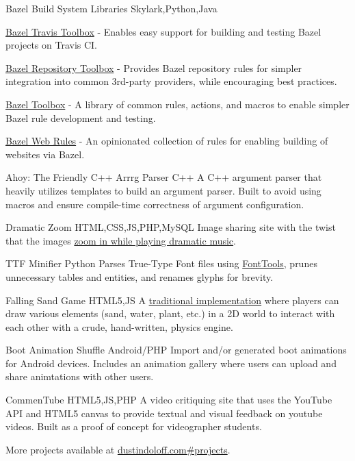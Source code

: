 \personalProject {} {Bazel Build System Libraries} {Skylark,Python,Java} {
    \begin {minimalItemize}
        \item \href {https://github.com/quittle/bazel_travis_toolbox} {Bazel Travis Toolbox} - Enables easy support for building and testing Bazel projects on Travis CI.
        \item \href {https://github.com/quittle/bazel_repository_toolbox} {Bazel Repository Toolbox} - Provides Bazel repository rules for simpler integration into common 3rd-party providers, while encouraging best practices.
        \item \href {https://github.com/quittle/bazel_toolbox} {Bazel Toolbox} - A library of common rules, actions, and macros to enable simpler Bazel rule development and testing.
        \item \href {https://github.com/quittle/rules_web} {Bazel Web Rules} - An opinionated collection of rules for enabling building of websites via Bazel.
    \end {minimalItemize}
}

 {Ahoy: The Friendly C++ Arrrg Parser} {C++} {
    A C++ argument parser that heavily utilizes templates to build an argument parser. Built to avoid using macros and ensure compile-time correctness of argument configuration.
}

 {Dramatic Zoom} {HTML,CSS,JS,PHP,MySQL} {
    Image sharing site with the twist that the images \href {https://youtu.be/a1Y73sPHKxw} {zoom in while playing dramatic music}.
}

\personalProject {} {TTF Minifier} {Python} {
    Parses True-Type Font files using \href {https://github.com/fonttools/fonttools} {FontTools}, prunes unnecessary tables and entities, and renames glyphs for brevity.
}

 {Falling Sand Game} {HTML5,JS} {
    A \href {https://en.wikipedia.org/wiki/Falling-sand_game} {traditional implementation} where players can draw various elements (sand, water, plant, etc.) in a 2D world to interact with each other with a crude, hand-written, physics engine.
}

 {Boot Animation Shuffle} {Android/PHP} {
    Import and/or generated boot animations for Android devices. Includes an animation gallery where users can upload and share animtations with other users.
}

 {CommenTube} {HTML5,JS,PHP} {
    A video critiquing site that uses the YouTube API and HTML5 canvas to provide textual and visual feedback on youtube videos. Built as a proof of concept for videographer students.
}

More projects available at \href {https://dustindoloff.com/\#projects} {dustindoloff.com\#projects}.